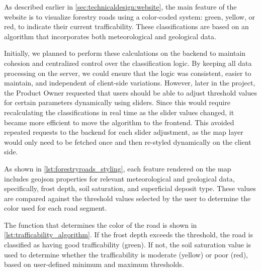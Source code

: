 As described earlier in \autoref{sec:technicaldesign:website}, the main feature of the website is to visualize forestry roads using a color-coded system: green, yellow, or red, to indicate their current trafficability.
These classifications are based on an algorithm that incorporates both meteorological and geological data.

Initially, we planned to perform these calculations on the backend to maintain cohesion and centralized control over the classification logic. By keeping all data processing on the server, we could ensure that the logic was consistent, easier to maintain, and independent of client-side variations. However, later in the project, the Product Owner requested that users should be able to adjust threshold values for certain parameters dynamically using sliders. Since this would require recalculating the classifications in real time as the slider values changed, it became more efficient to move the algorithm to the frontend. This avoided repeated requests to the backend for each slider adjustment, as the map layer would only need to be fetched once and then re-styled dynamically on the client side.

As shown in \autoref{lst:forestryroads_styling}, each feature rendered on the map includes \gls{geojson} properties for relevant meteorological and geological data, specifically, frost depth, soil saturation, and superficial deposit type. These values are compared against the threshold values selected by the user to determine the color used for each road segment.

The function that determines the color of the road is shown in \autoref{lst:trafficability_algorithm}. If the frost depth exceeds the threshold, the road is classified as having good trafficability (green). If not, the soil saturation value is used to determine whether the trafficability is moderate (yellow) or poor (red), based on user-defined minimum and maximum thresholds.

\begin{figure}[h]

\end{figure}

\begin{figure}[h]

\end{figure}

